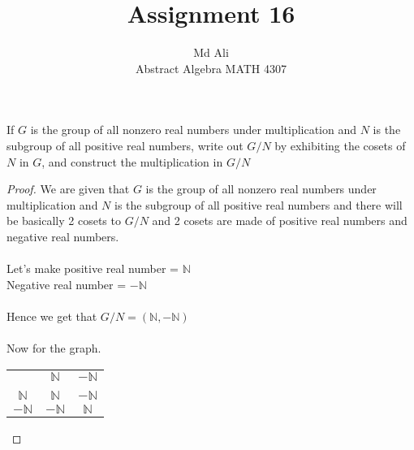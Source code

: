 \documentclass[12pt]{article}
\newenvironment{problem}[2][Problem]{\begin{trivlist}
\item[\hskip \labelsep {\bfseries #1}\hskip \labelsep {\bfseries #2.}]}{\end{trivlist}}
\begin{document}
 
 
\title{Assignment 16}%
\author{Md Ali\\ %
Abstract Algebra MATH 4307} %
 
\maketitle
 
\begin{problem}{2.6.1} %
If $G$ is the group of all nonzero real numbers under multiplication and $N$ is the subgroup of all positive real numbers, write out $G/N$ by exhibiting the cosets of $N$ in $G$, and construct the multiplication in $G/N$
\end{problem}
 
\begin{proof}
We are given that $G$ is the group of all nonzero real numbers under multiplication and $N$ is the subgroup of all positive real numbers and there will be basically 2 cosets to $G/N$ and 2 cosets are made of positive real numbers and negative real numbers. \\ \\
Let's make positive real number = $\mathbb{N}$ \\ 
Negative real number = $-\mathbb{N}$ \\ \\
Hence we get that $G/N = (\mathbb{N}, -\mathbb{N})$ \\ \\
Now for the graph. \\

\begin{center}
\begin{tabular}{ c c c }
& $\mathbb{N}$ & $-\mathbb{N}$ \\ \\
$\mathbb{N}$ & $\mathbb{N}$ & $-\mathbb{N}$ \\ 
$-\mathbb{N}$ &  $-\mathbb{N}$ & $\mathbb{N}$ \\
\end{tabular}
\end{center}
\bigskip
\centerline{} 
\bigskip

\end{proof}
\end{document}
